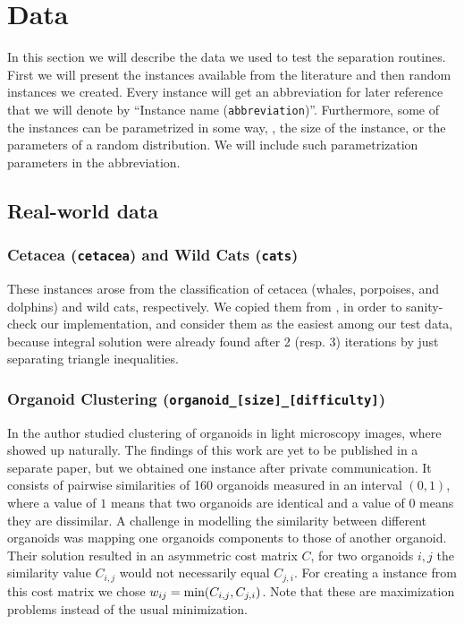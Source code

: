 \section{Data}\label{sec:data}
In this section we will describe the data we used to test the separation routines.
First we will present the instances available from the literature and then random instances we created.
Every instance will get an abbreviation for later reference that we will denote by “Instance name (\texttt{abbreviation})”.
Furthermore, some of the instances can be parametrized in some way, \eg, the size of the instance, or the parameters of a random distribution.
We will include such parametrization parameters in the abbreviation.

\subsection{Real-world data}
\subsubsection{Cetacea (\texttt{cetacea}) and Wild Cats (\texttt{cats})}\label{subsubsec:data_cetacea}
These instances arose from the classification of cetacea (whales, porpoises, and dolphins) and wild cats, respectively.
We copied them from \cite{grotschelCuttingPlaneAlgorithm1989}, in order to sanity-check our implementation,
and consider them as the easiest among our test data, because integral solution were already found after 2 (resp. 3) iterations by just separating triangle inequalities.

\subsubsection{Organoid Clustering (\texttt{organoid\_[size]\_[difficulty]})}
In \cite{presbergerSegmentationClusteringOrganoids2023} the author studied clustering of organoids in light microscopy images, where \CP showed up naturally.
The findings of this work are yet to be published in a separate paper, but we obtained one instance after private communication.
It consists of pairwise similarities of 160 organoids measured in an interval $(0,1)$, where a value of $1$ means that two organoids are identical and a value of $0$ means they are dissimilar.
A challenge in modelling the similarity between different organoids was mapping one organoids components to those of another organoid.
Their solution resulted in an asymmetric cost matrix $C$, \ie for two organoids $i, j$ the similarity value $C_{i,j}$ would not necessarily equal $C_{j,i}$.
For creating a \CP instance from this cost matrix we chose $w_{ij} = \operatorname{\text{min}}(C_{i,j}, C_{j,i})$.
Note that these are maximization problems instead of the usual minimization.

